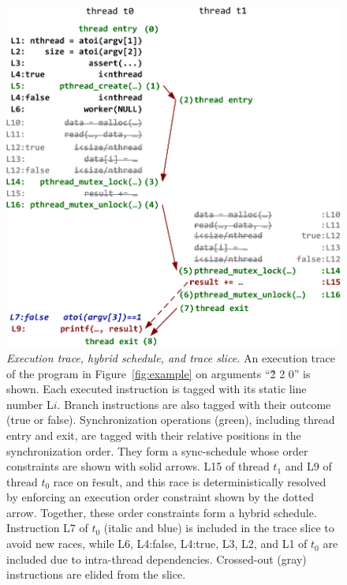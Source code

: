 \begin{figure}[t]
\begin{minipage}[t]{\columnwidth}
\centering
\includegraphics[width=\textwidth]{peregrine/figures/trace}
\end{minipage}
\caption{{\em Execution trace, hybrid schedule, and trace slice.}  An
  execution trace of the program in Figure~\ref{fig:example} on arguments
  ``\v{2 2 0}'' is shown.  Each executed instruction is tagged
  with its static line number L$i$.  Branch instructions are also tagged
  with their outcome (true or false).  Synchronization operations (green),
  including thread entry and exit, are tagged
  with their relative positions in the synchronization order.  They form a
  sync-schedule whose order constraints are shown with solid arrows.  L15 of
  thread $t_1$ and L9 of thread $t_0$ race on \v{result}, and this race is
  deterministically resolved by enforcing an execution order constraint
  shown by the dotted arrow.  Together, these order constraints form a hybrid
  schedule.  Instruction L7 of $t_0$ (italic and blue) is included in the
  trace slice to avoid new races, while L6, L4:false, L4:true, L3, L2, and
  L1 of $t_0$ are included due to intra-thread
  dependencies. Crossed-out (gray) instructions are elided from the
  slice.}\label{fig:trace}
\end{figure}

